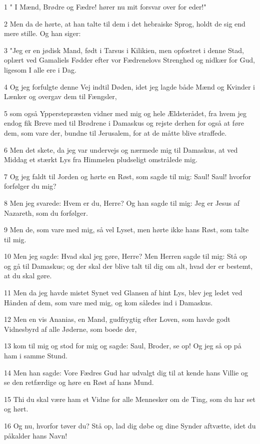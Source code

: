 \par 1 " I Mænd, Brødre og Fædre! hører nu mit forsvar over for eder!"
\par 2 Men da de hørte, at han talte til dem i det hebraiske Sprog, holdt de sig end mere stille. Og han siger:
\par 3 "Jeg er en jødisk Mand, født i Tarsus i Kilikien, men opfostret i denne Stad, oplært ved Gamaliels Fødder efter vor Fædrenelovs Strenghed og nidkær for Gud, ligesom I alle ere i Dag.
\par 4 Og jeg forfulgte denne Vej indtil Døden, idet jeg lagde både Mænd og Kvinder i Lænker og overgav dem til Fængsler,
\par 5 som også Ypperstepræsten vidner med mig og hele Ældsterådet, fra hvem jeg endog fik Breve med til Brødrene i Damaskus og rejste derhen for også at føre dem, som vare der, bundne til Jerusalem, for at de måtte blive straffede.
\par 6 Men det skete, da jeg var undervejs og nærmede mig til Damaskus, at ved Middag et stærkt Lys fra Himmelen pludseligt omstrålede mig.
\par 7 Og jeg faldt til Jorden og hørte en Røst, som sagde til mig: Saul! Saul! hvorfor forfølger du mig?
\par 8 Men jeg svarede: Hvem er du, Herre? Og han sagde til mig: Jeg er Jesus af Nazareth, som du forfølger.
\par 9 Men de, som vare med mig, så vel Lyset, men hørte ikke hans Røst, som talte til mig.
\par 10 Men jeg sagde: Hvad skal jeg gøre, Herre? Men Herren sagde til mig: Stå op og gå til Damaskus; og der skal der blive talt til dig om alt, hvad der er bestemt, at du skal gøre.
\par 11 Men da jeg havde mistet Synet ved Glansen af hint Lys, blev jeg ledet ved Hånden af dem, som vare med mig, og kom således ind i Damaskus.
\par 12 Men en vis Ananias, en Mand, gudfrygtig efter Loven, som havde godt Vidnesbyrd af alle Jøderne, som boede der,
\par 13 kom til mig og stod for mig og sagde: Saul, Broder, se op! Og jeg så op på ham i samme Stund.
\par 14 Men han sagde: Vore Fædres Gud har udvalgt dig til at kende hans Villie og se den retfærdige og høre en Røst af hans Mund.
\par 15 Thi du skal være ham et Vidne for alle Mennesker om de Ting, som du har set og hørt.
\par 16 Og nu, hvorfor tøver du? Stå op, lad dig døbe og dine Synder aftvætte, idet du påkalder hans Navn!
